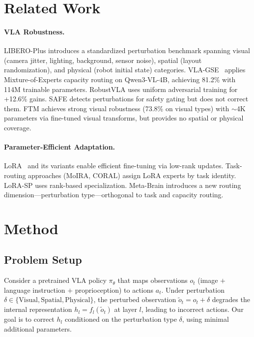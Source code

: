 \documentclass[10pt,twocolumn]{article}
\begin{document}
\section{Related Work}
\label{sec:related}

\paragraph{VLA Robustness.}
LIBERO-Plus introduces a standardized perturbation benchmark spanning visual (camera jitter, lighting, background, sensor noise), spatial (layout randomization), and physical (robot initial state) categories.
VLA-GSE~\cite{vlaGSE} applies Mixture-of-Experts capacity routing on Qwen3-VL-4B, achieving 81.2\% with 114M trainable parameters.
RobustVLA uses uniform adversarial training for +12.6\% gains.
SAFE detects perturbations for safety gating but does not correct them.
FTM achieves strong visual robustness (73.8\% on visual types) with ${\sim}$4K parameters via fine-tuned visual transforms, but provides no spatial or physical coverage.

\paragraph{Parameter-Efficient Adaptation.}
LoRA~\cite{hu2022lora} and its variants enable efficient fine-tuning via low-rank updates.
Task-routing approaches (MoIRA, CORAL) assign LoRA experts by task identity.
LoRA-SP uses rank-based specialization.
Meta-Brain introduces a new routing dimension---perturbation type---orthogonal to task and capacity routing.

\section{Method}
\label{sec:method}

\subsection{Problem Setup}

Consider a pretrained VLA policy $\pi_\theta$ that maps observations $o_t$ (image $+$ language instruction $+$ proprioception) to actions $a_t$.
Under perturbation $\delta \in \{\text{Visual}, \text{Spatial}, \text{Physical}\}$, the perturbed observation $\tilde{o}_t = o_t + \delta$ degrades the internal representation $h_l = f_l(\tilde{o}_t)$ at layer $l$, leading to incorrect actions.
Our goal is to correct $h_l$ conditioned on the perturbation type $\delta$, using minimal additional parameters.
\end{document}
